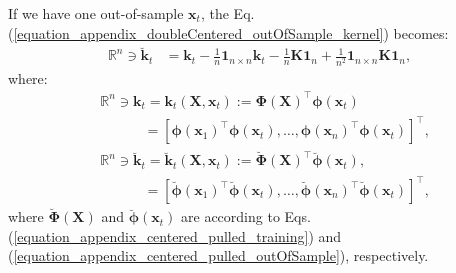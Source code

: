 \documentclass[lang=cn,10pt]{gorgeousnbook}
\numberwithin{equation}{section}%
\numberwithin{figure}{section}%
\begin{document}
If we have one out-of-sample $\boldsymbol{x}_t$, the Eq. (\ref{equation_appendix_doubleCentered_outOfSample_kernel}) becomes:
\begin{align}
\mathbb{R}^{n} \ni \breve{\boldsymbol{k}}_t &= \boldsymbol{k}_t - \frac{1}{n} \boldsymbol{1}_{n \times n} \boldsymbol{k}_t - \frac{1}{n} \boldsymbol{K} \boldsymbol{1}_{n} + \frac{1}{n^2} \boldsymbol{1}_{n \times n} \boldsymbol{K} \boldsymbol{1}_{n}, \label{equation_appendix_doubleCentered_outOfSample_kernel_oneSample}
\end{align}
where:
\begin{align}
&\mathbb{R}^n \ni \boldsymbol{k}_t = \boldsymbol{k}_t(\boldsymbol{X}, \boldsymbol{x}_t) := \boldsymbol{\Phi}(\boldsymbol{X})^\top \boldsymbol{\phi}(\boldsymbol{x}_t) \label{equation_appendix_kernelVector_outOfSample} \\
&~~~~~~~~~~~~~~ =[\boldsymbol{\phi}(\boldsymbol{x}_1)^\top \boldsymbol{\phi}(\boldsymbol{x}_t), \dots, \boldsymbol{\phi}(\boldsymbol{x}_n)^\top \boldsymbol{\phi}(\boldsymbol{x}_t)]^\top, \nonumber \\
&\mathbb{R}^n \ni \breve{\boldsymbol{k}}_t = \breve{\boldsymbol{k}}_t(\boldsymbol{X}, \boldsymbol{x}_t) := \breve{\boldsymbol{\Phi}}(\boldsymbol{X})^\top \breve{\boldsymbol{\phi}}(\boldsymbol{x}_t), \label{equation_appendix_centered_kernelVector_outOfSample} \\
&~~~~~~~~~~~~~~ =[\breve{\boldsymbol{\phi}}(\boldsymbol{x}_1)^\top \breve{\boldsymbol{\phi}}(\boldsymbol{x}_t), \dots, \breve{\boldsymbol{\phi}}(\boldsymbol{x}_n)^\top \breve{\boldsymbol{\phi}}(\boldsymbol{x}_t)]^\top, \nonumber 
\end{align}
where $\breve{\boldsymbol{\Phi}}(\boldsymbol{X})$ and $\breve{\boldsymbol{\phi}}(\boldsymbol{x}_t)$ are according to Eqs. (\ref{equation_appendix_centered_pulled_training}) and (\ref{equation_appendix_centered_pulled_outOfSample}), respectively.
\end{document}
